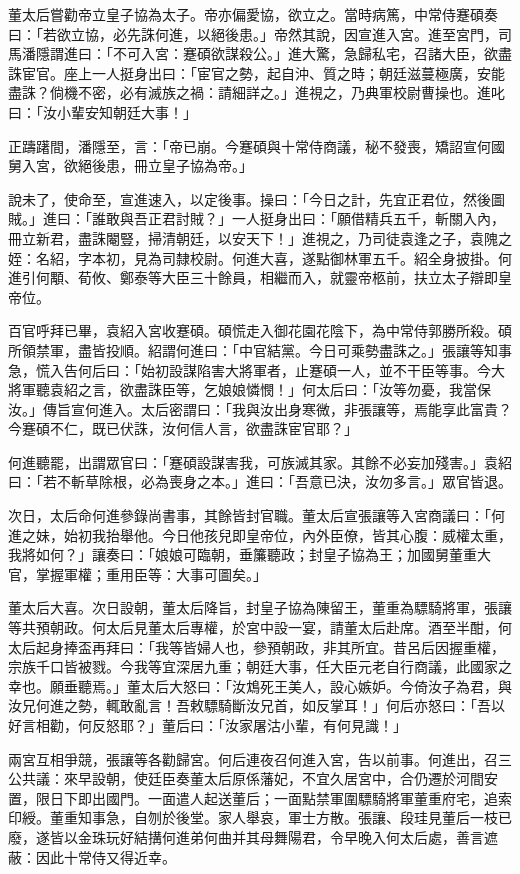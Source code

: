 董太后嘗勸帝立皇子協為太子。帝亦偏愛協，欲立之。當時病篤，中常侍蹇碩奏曰：「若欲立協，必先誅何進，以絕後患。」帝然其說，因宣進入宮。進至宮門，司馬潘隱謂進曰：「不可入宮：蹇碩欲謀殺公。」進大驚，急歸私宅，召諸大臣，欲盡誅宦官。座上一人挺身出曰：「宦官之勢，起自沖、質之時；朝廷滋蔓極廣，安能盡誅？倘機不密，必有滅族之禍：請細詳之。」進視之，乃典軍校尉曹操也。進叱曰：「汝小輩安知朝廷大事！」

正躊躇間，潘隱至，言：「帝已崩。今蹇碩與十常侍商議，秘不發喪，矯詔宣何國舅入宮，欲絕後患，冊立皇子協為帝。」

說未了，使命至，宣進速入，以定後事。操曰：「今日之計，先宜正君位，然後圖賊。」進曰：「誰敢與吾正君討賊？」一人挺身出曰：「願借精兵五千，斬關入內，冊立新君，盡誅閹豎，掃清朝廷，以安天下！」進視之，乃司徒袁逢之子，袁隗之姪：名紹，字本初，見為司隸校尉。何進大喜，遂點御林軍五千。紹全身披掛。何進引何顒、荀攸、鄭泰等大臣三十餘員，相繼而入，就靈帝柩前，扶立太子辯即皇帝位。

百官呼拜已畢，袁紹入宮收蹇碩。碩慌走入御花園花陰下，為中常侍郭勝所殺。碩所領禁軍，盡皆投順。紹謂何進曰：「中官結黨。今日可乘勢盡誅之。」張讓等知事急，慌入告何后曰：「始初設謀陷害大將軍者，止蹇碩一人，並不干臣等事。今大將軍聽袁紹之言，欲盡誅臣等，乞娘娘憐憫！」何太后曰：「汝等勿憂，我當保汝。」傳旨宣何進入。太后密謂曰：「我與汝出身寒微，非張讓等，焉能享此富貴？今蹇碩不仁，既已伏誅，汝何信人言，欲盡誅宦官耶？」

何進聽罷，出謂眾官曰：「蹇碩設謀害我，可族滅其家。其餘不必妄加殘害。」袁紹曰：「若不斬草除根，必為喪身之本。」進曰：「吾意已決，汝勿多言。」眾官皆退。

次日，太后命何進參錄尚書事，其餘皆封官職。董太后宣張讓等入宮商議曰：「何進之妹，始初我抬舉他。今日他孩兒即皇帝位，內外臣僚，皆其心腹：威權太重，我將如何？」讓奏曰：「娘娘可臨朝，垂簾聽政；封皇子協為王；加國舅董重大官，掌握軍權；重用臣等：大事可圖矣。」

董太后大喜。次日設朝，董太后降旨，封皇子協為陳留王，董重為驃騎將軍，張讓等共預朝政。何太后見董太后專權，於宮中設一宴，請董太后赴席。酒至半酣，何太后起身捧盃再拜曰：「我等皆婦人也，參預朝政，非其所宜。昔呂后因握重權，宗族千口皆被戮。今我等宜深居九重；朝廷大事，任大臣元老自行商議，此國家之幸也。願垂聽焉。」董太后大怒曰：「汝鴆死王美人，設心嫉妒。今倚汝子為君，與汝兄何進之勢，輒敢亂言！吾敕驃騎斷汝兄首，如反掌耳！」何后亦怒曰：「吾以好言相勸，何反怒耶？」董后曰：「汝家屠沽小輩，有何見識！」

兩宮互相爭競，張讓等各勸歸宮。何后連夜召何進入宮，告以前事。何進出，召三公共議：來早設朝，使廷臣奏董太后原係藩妃，不宜久居宮中，合仍遷於河間安置，限日下即出國門。一面遣人起送董后；一面點禁軍圍驃騎將軍董重府宅，追索印綬。董重知事急，自刎於後堂。家人舉哀，軍士方散。張讓、段珪見董后一枝已廢，遂皆以金珠玩好結搆何進弟何曲并其母舞陽君，令早晚入何太后處，善言遮蔽：因此十常侍又得近幸。

